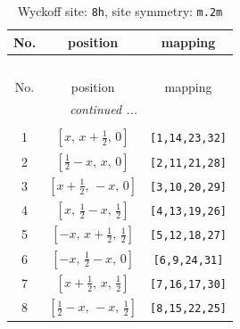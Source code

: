 \documentclass[fleqn,8pt]{jsarticle}
\begin{document}
\begin{longtable}{ccc}
\caption{Wyckoff site: {\tt 8h}, site symmetry: {\tt m.2m}}
 \\
 \hline \hline
No. & position & mapping \\ \hline \endfirsthead

\multicolumn{2}{l}{\tablename\ \thetable{}} \\
 \hline \hline
No. & position & mapping \\ \hline \endhead

 \hline \hline
\multicolumn{2}{r}{\footnotesize\it continued ...} \\ \endfoot

 \hline \hline
\multicolumn{2}{r}{} \\ \endlastfoot

1 & $\left[ x,\, x + \frac{1}{2},\, 0 \right]$ & {\tt [1,14,23,32]} \\ \hline
2 & $\left[ \frac{1}{2} - x,\, x,\, 0 \right]$ & {\tt [2,11,21,28]} \\ \hline
3 & $\left[ x + \frac{1}{2},\, - x,\, 0 \right]$ & {\tt [3,10,20,29]} \\ \hline
4 & $\left[ x,\, \frac{1}{2} - x,\, \frac{1}{2} \right]$ & {\tt [4,13,19,26]} \\ \hline
5 & $\left[ - x,\, x + \frac{1}{2},\, \frac{1}{2} \right]$ & {\tt [5,12,18,27]} \\ \hline
6 & $\left[ - x,\, \frac{1}{2} - x,\, 0 \right]$ & {\tt [6,9,24,31]} \\ \hline
7 & $\left[ x + \frac{1}{2},\, x,\, \frac{1}{2} \right]$ & {\tt [7,16,17,30]} \\ \hline
8 & $\left[ \frac{1}{2} - x,\, - x,\, \frac{1}{2} \right]$ & {\tt [8,15,22,25]} \\
\end{longtable}
\renewcommand{\arraystretch}{1.2}
\end{document}
